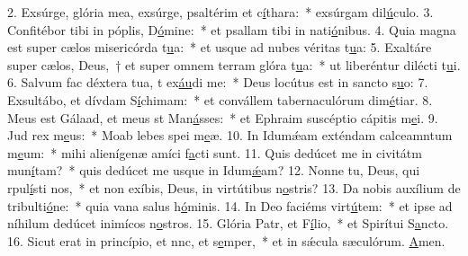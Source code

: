 2. Exsúrge, glória mea, exsúrge, psaltérim et c\uline{í}thara:~* exsúrgam dil\uline{ú}culo.
3. Confitébor tibi in póplis, D\uline{ó}mine:~* et psallam tibi in nati\uline{ó}nibus.
4. Quia magna est super cælos misericórda t\uline{u}a:~* et usque ad nubes véritas t\uline{u}a:
5. Exaltáre super cælos, Deus,~† et super omnem terram glóra t\uline{u}a:~* ut liberéntur dilécti t\uline{u}i.
6. Salvum fac déxtera tua, t ex\uline{áu}di me:~* Deus locútus est in sancto s\uline{u}o:
7. Exsultábo, et dívdam S\uline{í}chimam:~* et convállem tabernaculórum dim\uline{é}tiar.
8. Meus est Gálaad, et meus st Man\uline{á}sses:~* et Ephraim suscéptio cápitis m\uline{e}i.
9. Jud rex m\uline{e}us:~* Moab lebes spei m\uline{e}æ.
10. In Idumǽam exténdam calceamntum m\uline{e}um:~* mihi alienígenæ amíci f\uline{a}cti sunt.
11. Quis dedúcet me in civitátm mun\uline{í}tam?~* quis dedúcet me usque in Idum\uline{ǽ}am?
12. Nonne tu, Deus, qui rpul\uline{í}sti nos,~* et non exíbis, Deus, in virtútibus n\uline{o}stris?
13. Da nobis auxílium de tribulti\uline{ó}ne:~* quia vana salus h\uline{ó}minis.
14. In Deo faciéms virt\uline{ú}tem:~* et ipse ad níhilum dedúcet inimícos n\uline{o}stros.
15. Glória Patr, et F\uline{í}lio,~* et Spirítui S\uline{a}ncto.
16. Sicut erat in princípio, et nnc, et s\uline{e}mper,~* et in sǽcula sæculórum. \uline{A}men.
